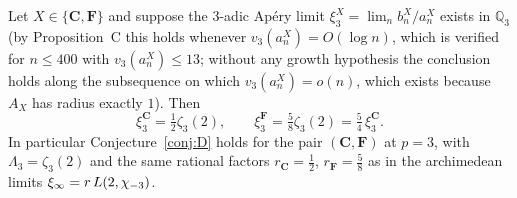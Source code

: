 \begin{theorem}\label{thm:conjD3}
\Proved{} Let $X\in\{\mathbf C,\mathbf F\}$ and suppose the $3$-adic Ap\'ery limit
$\xi^X_3=\lim_n b^X_n/a^X_n$ exists in $\mathbb Q_3$ \textup{(}by Proposition~C this holds
whenever $v_3(a^X_n)=O(\log n)$, which is verified for $n\le400$ with $v_3(a^X_n)\le13$;
without any growth hypothesis the conclusion holds along the subsequence on which
$v_3(a^X_n)=o(n)$, which exists because $A_X$ has radius exactly $1$\textup{)}.  Then
\[
\boxed{\ \xi^{\mathbf C}_3=\tfrac12\zeta_3(2),\qquad
\xi^{\mathbf F}_3=\tfrac58\zeta_3(2)=\tfrac54\,\xi^{\mathbf C}_3 .\ }
\]
In particular Conjecture~\ref{conj:D} holds for the pair $(\mathbf C,\mathbf F)$
at $p=3$, with $\Lambda_3=\zeta_3(2)$ and the same rational factors
$r_{\mathbf C}=\tfrac12$, $r_{\mathbf F}=\tfrac58$ as in the archimedean limits
$\xi_\infty=r\,L(2,\chi_{-3})$.
\end{theorem}

